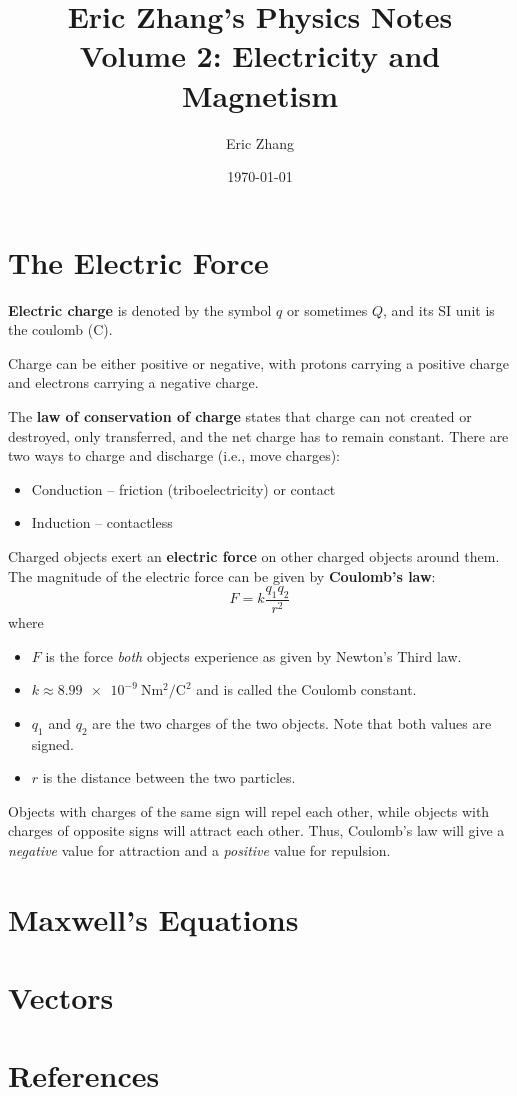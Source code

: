\documentclass[a4paper, titlepage]{book}
\title{
    Eric Zhang's Physics Notes \\
    \large Volume 2: Electricity and Magnetism
}
\author{Eric Zhang}
\date{\today}
\begin{document}
\frontmatter
\maketitle
\tableofcontents


\mainmatter

\chapter{The Electric Force}

\textbf{Electric charge} is denoted by the symbol \(q\) or sometimes \(Q\),
and its SI unit is the coulomb (C).

Charge can be either positive or negative,
with protons carrying a positive charge and electrons carrying a negative charge.

The \textbf{law of conservation of  charge} states that charge can not created or destroyed,
only transferred,
and the net charge has to remain constant.
There are two ways to charge and discharge (i.e., move charges):
\begin{itemize}
    \item Conduction -- friction (triboelectricity) or contact
    \item Induction -- contactless
\end{itemize}

Charged objects exert an \textbf{electric force} on other charged objects around them.
The magnitude of the electric force can be given by \textbf{Coulomb's law}:
\begin{equation}
    F = k\frac{q_1 q_2}{r^2}
\end{equation}
where
\begin{itemize}
    \item \(F\) is the force \emph{both} objects experience as given by Newton's Third law.
    \item \(k \approx \qty{8.99e-9}{\newton \meter\squared \per \coulomb\squared}\)
          and is called the Coulomb constant.
    \item \(q_1\) and \(q_2\) are the two charges of the two objects.
          Note that both values are signed.
    \item \(r\) is the distance between the two particles.
\end{itemize}
Objects with charges of the same sign will repel each other,
while objects with charges of opposite signs will attract each other.
Thus, Coulomb's law will give a \emph{negative} value for attraction
and a \emph{positive} value for repulsion.

\chapter{Maxwell's Equations}


\appendix
\chapter{Vectors} \label{ch:vectors}


\backmatter
\chapter{References}
\end{document}
